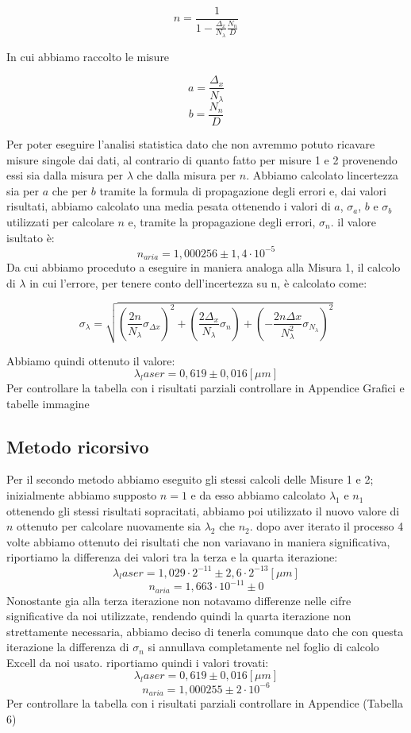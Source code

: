 \documentclass{article}
\begin{document}
\begin{equation} 
n= \frac{1}{1 - \frac{\Delta_x}{N_\lambda} \frac{N_n}{D}} 
\end{equation}

In cui abbiamo raccolto le misure

\[ a = \frac{\Delta_x}{N_\lambda} \]
\[ b = \frac{N_n}{D} \]

Per poter eseguire l'analisi statistica dato che non avremmo potuto ricavare misure singole dai dati, al contrario di quanto fatto per misure 1 e 2 provenendo essi sia dalla misura per $\lambda$ che dalla misura per $n$. Abbiamo calcolato lincertezza sia per $a$ che per $b$ tramite la formula di propagazione degli errori e, dai valori risultati, abbiamo calcolato una media pesata ottenendo i valori di $a$, $\sigma_a$, $b$ e $\sigma_b$ utilizzati per calcolare $n$ e, tramite la propagazione degli errori, $\sigma_n$. il valore isultato è:
\[ n_{aria} = 1,000256 \pm 1,4 \cdot 10^{-5} \]
Da cui abbiamo proceduto a eseguire in maniera analoga alla Misura 1, il calcolo di $\lambda$ in cui l'errore, per tenere conto dell'incertezza su n, è calcolato come:

\begin{equation} 
\sigma_\lambda= \sqrt{(\frac{2 n}{N_\lambda} \sigma_{\Delta x})^2 + (\frac{2 \Delta_x}{N_\lambda} \sigma_n) + ({-} \frac{2 n \Delta x}{N_\lambda^2} \sigma_{N_\lambda})^2} 
\end{equation}

Abbiamo quindi ottenuto il valore:
\[ \lambda_laser = 0,619 \pm 0,016 [\mu m] \]
Per controllare la tabella con i risultati parziali controllare in Appendice Grafici e tabelle immagine %



\subsection{Metodo ricorsivo}
Per il secondo metodo abbiamo eseguito gli stessi calcoli delle Misure 1 e 2; inizialmente abbiamo supposto $n = 1$ e da esso abbiamo calcolato $\lambda_1$ e $n_1$ ottenendo gli stessi risultati sopracitati, abbiamo poi utilizzato il nuovo valore di $n$ ottenuto per calcolare nuovamente sia $\lambda_2$ che $n_2$. dopo aver iterato il processo 4 volte abbiamo ottenuto dei risultati che non variavano in maniera significativa, riportiamo la differenza dei valori tra la terza e la quarta iterazione:
\[ \lambda_laser = 1,029 \cdot 2^{-11} \pm 2,6 \cdot 2^{-13} [\mu m] \]
\[ n_{aria} = 1,663 \cdot 10^{-11} \pm 0 \]
Nonostante gia alla terza iterazione non notavamo differenze nelle cifre significative da noi utilizzate, rendendo quindi la quarta iterazione non strettamente necessaria, abbiamo deciso di tenerla comunque dato che con questa iterazione la differenza di $\sigma_n$ si annullava completamente nel foglio di calcolo Excell da noi usato. riportiamo quindi i valori trovati:
\[ \lambda_laser = 0,619 \pm 0,016 [\mu m] \]
\[ n_{aria} = 1,000255 \pm 2 \cdot 10^{-6} \]
Per controllare la tabella con i risultati parziali controllare in Appendice (Tabella 6)
\end{document}
